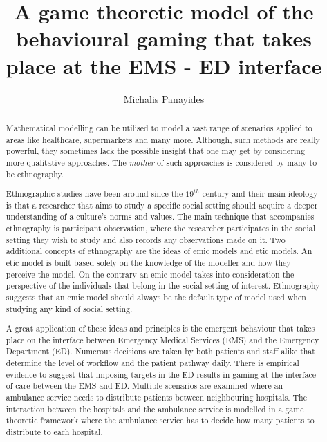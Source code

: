 \documentclass{article}
\title{A game theoretic model of the behavioural gaming that takes place at the EMS - ED interface}
\author{Michalis Panayides}
\begin{document}
\maketitle
\begin{abstract}
    Mathematical modelling can be utilised to model a vast range of scenarios
    applied to areas like healthcare, supermarkets and many more. Although, such 
    methods are really powerful, they sometimes lack the possible insight that one 
    may get by considering more qualitative approaches. The \textit{mother} of 
    such approaches is considered by many to be ethnography. 

    Ethnographic studies have been around since the \(19^{th}\) century and
    their main ideology is that a researcher that aims to study a specific social 
    setting should acquire a deeper understanding of a culture's norms and values. 
    The main technique that accompanies ethnography is participant observation, 
    where the researcher participates in the social setting they wish to study and 
    also records any observations made on it. Two additional concepts of 
    ethnography are the ideas of emic models and etic models. An etic model is 
    built based solely on the knowledge of the modeller and how they perceive the 
    model. On the contrary an emic model takes into consideration the perspective 
    of the individuals that belong in the social setting of interest. Ethnography 
    suggests that an emic model should always be the default type of model used 
    when studying any kind of social setting.

    A great application of these ideas and principles is the emergent behaviour
    that takes place on the interface between Emergency Medical Services (EMS) and 
    the Emergency Department (ED). Numerous decisions are taken by both patients 
    and staff alike that determine the level of workflow and the patient pathway 
    daily. There is empirical evidence to suggest that imposing targets in the ED 
    results in gaming at the interface of care between the EMS and ED. Multiple 
    scenarios are examined where an ambulance service needs to distribute patients 
    between neighbouring hospitals. The interaction between the hospitals and the 
    ambulance service is modelled in a game theoretic framework where the 
    ambulance service has to decide how many patients to distribute to each 
    hospital.
        
\end{abstract}
    
\end{document}
